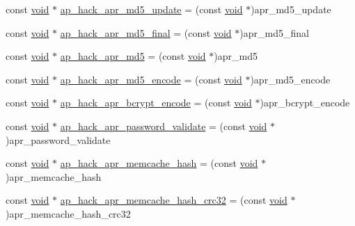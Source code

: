 \begin{DoxyCompactItemize}
\item 
const \hyperlink{group__MOD__ISAPI_gacd6cdbf73df3d9eed42fa493d9b621a6}{void} $\ast$ \hyperlink{srclib_2apr-util_2exports_8c_aa882d06a40ad686f1e3f2644ca8bcc2c}{ap\+\_\+hack\+\_\+apr\+\_\+md5\+\_\+update} = (const \hyperlink{group__MOD__ISAPI_gacd6cdbf73df3d9eed42fa493d9b621a6}{void} $\ast$)apr\+\_\+md5\+\_\+update
\item 
const \hyperlink{group__MOD__ISAPI_gacd6cdbf73df3d9eed42fa493d9b621a6}{void} $\ast$ \hyperlink{srclib_2apr-util_2exports_8c_a71bdea389d99bfa53bb37e3e8955b4cb}{ap\+\_\+hack\+\_\+apr\+\_\+md5\+\_\+final} = (const \hyperlink{group__MOD__ISAPI_gacd6cdbf73df3d9eed42fa493d9b621a6}{void} $\ast$)apr\+\_\+md5\+\_\+final
\item 
const \hyperlink{group__MOD__ISAPI_gacd6cdbf73df3d9eed42fa493d9b621a6}{void} $\ast$ \hyperlink{srclib_2apr-util_2exports_8c_ad58f0966d154ec4b565cc321acc7c537}{ap\+\_\+hack\+\_\+apr\+\_\+md5} = (const \hyperlink{group__MOD__ISAPI_gacd6cdbf73df3d9eed42fa493d9b621a6}{void} $\ast$)apr\+\_\+md5
\item 
const \hyperlink{group__MOD__ISAPI_gacd6cdbf73df3d9eed42fa493d9b621a6}{void} $\ast$ \hyperlink{srclib_2apr-util_2exports_8c_af640efe50bf86776755036d9efb4cfbf}{ap\+\_\+hack\+\_\+apr\+\_\+md5\+\_\+encode} = (const \hyperlink{group__MOD__ISAPI_gacd6cdbf73df3d9eed42fa493d9b621a6}{void} $\ast$)apr\+\_\+md5\+\_\+encode
\item 
const \hyperlink{group__MOD__ISAPI_gacd6cdbf73df3d9eed42fa493d9b621a6}{void} $\ast$ \hyperlink{srclib_2apr-util_2exports_8c_ab2d5379569e5b7476f6ca181de299710}{ap\+\_\+hack\+\_\+apr\+\_\+bcrypt\+\_\+encode} = (const \hyperlink{group__MOD__ISAPI_gacd6cdbf73df3d9eed42fa493d9b621a6}{void} $\ast$)apr\+\_\+bcrypt\+\_\+encode
\item 
const \hyperlink{group__MOD__ISAPI_gacd6cdbf73df3d9eed42fa493d9b621a6}{void} $\ast$ \hyperlink{srclib_2apr-util_2exports_8c_a6abbfa6885e0b239604bd32d310ccde6}{ap\+\_\+hack\+\_\+apr\+\_\+password\+\_\+validate} = (const \hyperlink{group__MOD__ISAPI_gacd6cdbf73df3d9eed42fa493d9b621a6}{void} $\ast$)apr\+\_\+password\+\_\+validate
\item 
const \hyperlink{group__MOD__ISAPI_gacd6cdbf73df3d9eed42fa493d9b621a6}{void} $\ast$ \hyperlink{srclib_2apr-util_2exports_8c_a172ddb874b0fa12d0e9b4ee15c1f095b}{ap\+\_\+hack\+\_\+apr\+\_\+memcache\+\_\+hash} = (const \hyperlink{group__MOD__ISAPI_gacd6cdbf73df3d9eed42fa493d9b621a6}{void} $\ast$)apr\+\_\+memcache\+\_\+hash
\item 
const \hyperlink{group__MOD__ISAPI_gacd6cdbf73df3d9eed42fa493d9b621a6}{void} $\ast$ \hyperlink{srclib_2apr-util_2exports_8c_a8af6be1b458e5c6f8761d1722bb733bb}{ap\+\_\+hack\+\_\+apr\+\_\+memcache\+\_\+hash\+\_\+crc32} = (const \hyperlink{group__MOD__ISAPI_gacd6cdbf73df3d9eed42fa493d9b621a6}{void} $\ast$)apr\+\_\+memcache\+\_\+hash\+\_\+crc32

\end{DoxyCompactItemize}
